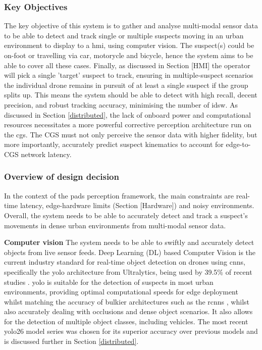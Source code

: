 \documentclass{report_template_oxford}
\begin{document}
\subsubsection{Key Objectives}
The key objective of this system is to gather and analyse multi-modal sensor data to be able to detect and track single or multiple suspects moving in an urban environment to display to a \gls{hmi}, using computer vision. The suspect(s) could be on-foot or travelling via car, motorycle and bicycle, hence the system aims to be able to cover all these cases. Finally, as discussed in Section [HMI] the operator will pick a single 'target' suspect to track, ensuring in multiple-suspect scenarios the individual drone remains in pursuit of at least a single suspect if the group splits up. This means the system should be able to detect with high recall, decent precision, and robust tracking accuracy, minimising the number of \gls{idsw}. As discussed in Section \ref{distributed}, the lack of onboard power and computational resources necessitates a more powerful corrective perception architecture run on the \gls{cgs}. The CGS must not only perceive the sensor data with higher fidelity, but more importantly, accurately predict suspect kinematics to account for edge-to-CGS network latency.

\subsubsection{Overview of design decision}
In the context of the \gls{pads} perception framework, the main constraints are real-time latency, edge-hardware limits (Section [Hardware]) and noisy environments. Overall, the system needs to be able to accurately detect and track a suspect's movements in dense urban environments from multi-modal sensor data. 

\textbf{Computer vision} \quad The system needs to be able to swiftly and accurately detect objects from live sensor feeds. Deep Learning (DL) based Computer Vision is the current industry standard for real-time object detection on drones using \glspl{cnn}, specifically the \gls{yolo} \cite{ultralytics_yolo26} architecture from Ultralytics, being used by 39.5\% of recent studies \cite{KATKURI2024100361}. \gls{yolo} is suitable for the detection of suspects in most urban environments, providing optimal computational speeds for edge deployment whilst matching the accuracy of bulkier architectures such as the \glspl{rcnn} \cite{DBLP:journals/corr/RedmonDGF15}, whilst also accurately dealing with occlusions and dense object scenarios. It also allows for the detection of multiple object classes, including vehicles. The most recent \gls{yolo}26 model series was chosen for its superior accuracy over previous models and is discussed further in Section \ref{distributed}.
\end{document}
